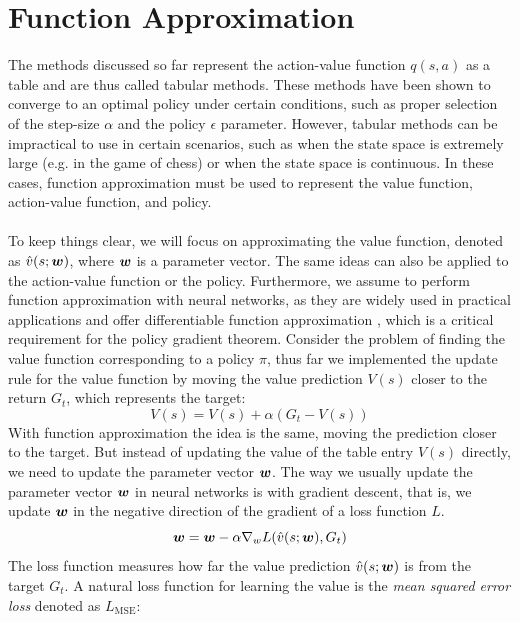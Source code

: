 \section{Function Approximation}
The methods discussed so far represent the action-value function $q(s, a)$ as a table and are thus called tabular methods. These methods have been shown to converge to an optimal policy under certain conditions, such as proper selection of the step-size $\alpha$ and the policy $\epsilon$ parameter. However, tabular methods can be impractical to use in certain scenarios, such as when the state space is extremely large (e.g. in the game of chess) or when the state space is continuous. In these cases, function approximation must be used to represent the value function, action-value function, and policy.\\\\
To keep things clear, we will focus on approximating the value function, denoted as $\hat{v}(s; \boldsymbol{w})$, where $\boldsymbol{w}$ is a parameter vector. The same ideas can also be applied to the action-value function or the policy. Furthermore, we assume to perform function approximation with neural networks, as they are widely used in practical applications and offer differentiable function approximation \cite{lecun2015deep}, which is a critical requirement for the policy gradient theorem.
Consider the problem of finding the value function corresponding to a policy $\pi$, thus far we implemented the update rule for the value function by moving the value prediction $V(s)$ closer to the return $G_t$, which represents the target:
\begin{equation}
    V(s) = V(s) + \alpha (G_t - V(s))
    \label{eq:tabular-update}
\end{equation}
With function approximation the idea is the same, moving the prediction closer to the target. But instead of updating the value of the table entry $V(s)$ directly, we need to update the parameter vector $\boldsymbol{w}$. The way we usually update the parameter vector $\boldsymbol{w}$ in neural networks is with gradient descent, that is, we update $\boldsymbol{w}$ in the negative direction of the gradient of a loss function $L$.
\begin{equation}
    \boldsymbol{w} = \boldsymbol{w} - \alpha \nabla_w L(\hat{v}(s; \boldsymbol{w}), G_t)
    \label{eq:nn-update}
\end{equation}
The loss function measures how far the value prediction $\hat{v}(s; \boldsymbol{w})$ is from the target $G_t$. A natural loss function for learning the value is the \textit{mean squared error loss} denoted as $L_\textrm{MSE}$:
